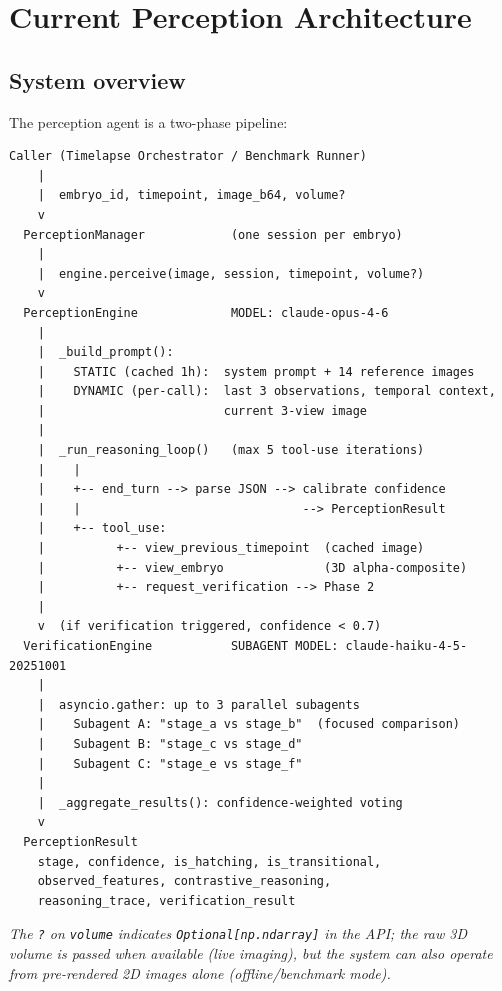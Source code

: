 \documentclass[11pt, a4paper]{article}
\begin{document}
\section{Current Perception Architecture}

\subsection{System overview}

The perception agent is a two-phase pipeline:

\begin{Verbatim}[fontsize=\small, frame=single, framesep=8pt, baselinestretch=0.95]
  Caller (Timelapse Orchestrator / Benchmark Runner)
    |
    |  embryo_id, timepoint, image_b64, volume?
    v
  PerceptionManager            (one session per embryo)
    |
    |  engine.perceive(image, session, timepoint, volume?)
    v
  PerceptionEngine             MODEL: claude-opus-4-6
    |
    |  _build_prompt():
    |    STATIC (cached 1h):  system prompt + 14 reference images
    |    DYNAMIC (per-call):  last 3 observations, temporal context,
    |                         current 3-view image
    |
    |  _run_reasoning_loop()   (max 5 tool-use iterations)
    |    |
    |    +-- end_turn --> parse JSON --> calibrate confidence
    |    |                               --> PerceptionResult
    |    +-- tool_use:
    |          +-- view_previous_timepoint  (cached image)
    |          +-- view_embryo              (3D alpha-composite)
    |          +-- request_verification --> Phase 2
    |
    v  (if verification triggered, confidence < 0.7)
  VerificationEngine           SUBAGENT MODEL: claude-haiku-4-5-20251001
    |
    |  asyncio.gather: up to 3 parallel subagents
    |    Subagent A: "stage_a vs stage_b"  (focused comparison)
    |    Subagent B: "stage_c vs stage_d"
    |    Subagent C: "stage_e vs stage_f"
    |
    |  _aggregate_results(): confidence-weighted voting
    v
  PerceptionResult
    stage, confidence, is_hatching, is_transitional,
    observed_features, contrastive_reasoning,
    reasoning_trace, verification_result
\end{Verbatim}

\noindent\small\textit{The \texttt{?} on \texttt{volume} indicates
\texttt{Optional[np.ndarray]} in the API; the raw 3D volume is passed when
available (live imaging), but the system can also operate from pre-rendered 2D
images alone (offline/benchmark mode).}
\normalsize
\end{document}
